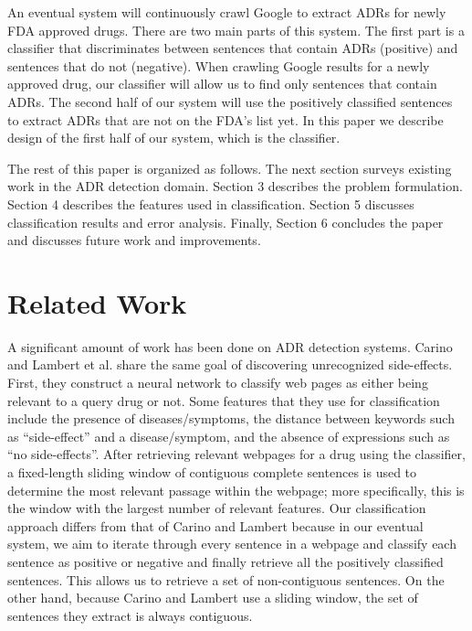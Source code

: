 \documentclass{acm_proc_article-sp}
\begin{document}
An eventual system will continuously crawl Google to extract ADRs for newly FDA approved drugs. There are two main parts of this system. The first part is a classifier that discriminates between sentences that contain ADRs (positive) and sentences that do not (negative). When crawling Google results for a newly approved drug, our classifier will allow us to find only sentences that contain ADRs. The second half of our system will use the positively classified sentences to extract ADRs that are not on the FDA's list yet. In this paper we describe design of the first half of our system, which is the classifier. 

The rest of this paper is organized as follows. The next section surveys existing work in the ADR detection domain. Section 3 describes the problem formulation. Section 4 describes the features used in classification. Section 5 discusses classification results and error analysis. Finally, Section 6 concludes the paper and discusses future work and improvements.

\section{Related Work}
A significant amount of work has been done on ADR detection systems. Carino and Lambert et al. \cite{Carino} share the same goal of discovering unrecognized side-effects. First, they construct a neural network to classify web pages as either being relevant to a query drug or not. Some features that they use for classification include the presence of diseases/symptoms, the distance between keywords such as ``side-effect'' and a disease/symptom, and the absence of expressions such as ``no side-effects''. After retrieving relevant webpages for a drug using the classifier, a fixed-length sliding window of contiguous complete sentences is used to determine the most relevant passage within the webpage; more specifically, this is the window with the largest number of relevant features. Our classification approach differs from that of Carino and Lambert because in our eventual system, we aim to iterate through every sentence in a webpage and classify each sentence as positive or negative and finally retrieve all the positively classified sentences. This allows us to retrieve a set of non-contiguous sentences. On the other hand, because Carino and Lambert use a sliding window, the set of sentences they extract is always contiguous. 
\end{document}
